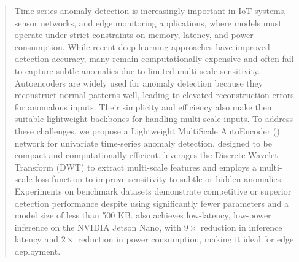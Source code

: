 \maketitle
\begin{abstract}
Time-series anomaly detection is increasingly important in IoT systems, sensor networks, and edge monitoring applications, where models must operate under strict constraints on memory, latency, and power consumption. While recent deep-learning approaches have improved detection accuracy, many remain computationally expensive and often fail to capture subtle anomalies due to limited multi-scale sensitivity. Autoencoders are widely used for anomaly detection because they reconstruct normal patterns well, leading to elevated reconstruction errors for anomalous inputs. Their simplicity and efficiency also make them suitable lightweight backbones for handling multi-scale inputs. To address these challenges, we propose a Lightweight MultiScale AutoEncoder (\fname{}) network for univariate time-series anomaly detection, designed to be compact and computationally efficient. \fname{} leverages the Discrete Wavelet Transform (DWT) to extract multi-scale features and employs a multi-scale loss function to improve sensitivity to subtle or hidden anomalies. Experiments on benchmark datasets demonstrate competitive or superior detection performance despite using significantly fewer parameters and a model size of less than 500 KB. \fname{} also achieves low-latency, low-power inference on the NVIDIA Jetson Nano, with $9\times$ reduction in inference latency and $2\times$ reduction in power consumption, making it ideal for edge deployment. 
\end{abstract}













 



